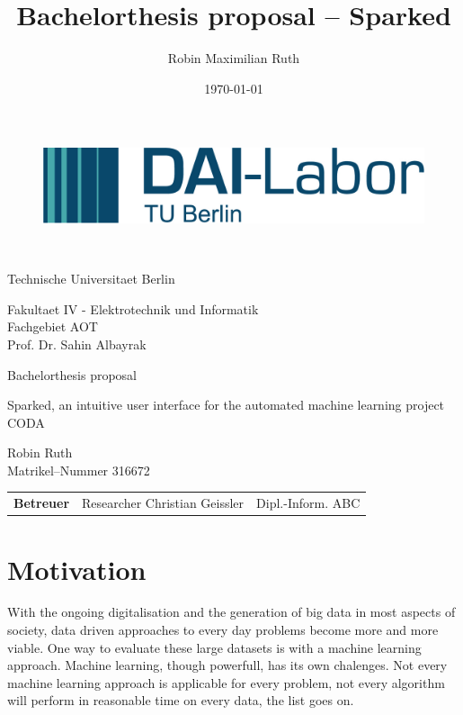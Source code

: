 \documentclass[12pt,a4paper,titlepage,oneside,BCOR1cm]{scrreprt}
\date{\today}
\author{Robin Maximilian Ruth}
\title{Bachelorthesis proposal -- Sparked}
\begin{document}
\thispagestyle{empty}

\begin{figure}[htbp]
\centering
 \begin{minipage}[b]{41 mm}
   \includegraphics[width=40 mm]{./figures/DAI_Logo.png}
 \end{minipage}
\end{figure}

~\vspace{0.5cm}

\begin{center}
\begin{Huge}
Technische Universitaet Berlin\\
\vspace{1mm}
\end{Huge}{\Large Fakultaet IV - Elektrotechnik und Informatik\\
Fachgebiet AOT\\
Prof. Dr. Sahin Albayrak}\\

\vspace{26mm}
\begin{LARGE}
Bachelorthesis proposal\\
\end{LARGE}
\vspace{8mm}
\begin{LARGE}
Sparked, an intuitive user interface for the automated machine learning project CODA\\
\end{LARGE}
\vspace{3 cm}
Robin Ruth\\
Matrikel--Nummer 316672\\
\vspace{1cm}
\begin{tabular}{lll}
    \textbf{Betreuer} & Researcher Christian Geissler & Dipl.-Inform. ABC\\
\end{tabular}

\end{center}

\tableofcontents
\thispagestyle{empty}


\chapter{Motivation}
With the ongoing digitalisation and the generation of big data in most aspects of society, data driven approaches to every day problems become more and more viable. One way to evaluate these large datasets is with a machine learning approach. Machine learning, though powerfull, has its own chalenges. Not every machine learning approach is applicable for every problem, not every algorithm will perform in reasonable time on every data, the list goes on.
\end{document}
